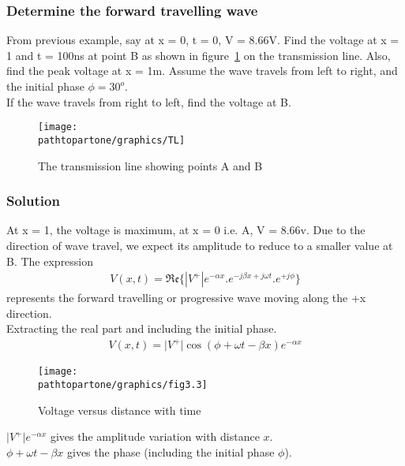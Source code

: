 \begin{exmp}
\subsubsection*{Determine the forward travelling wave}\label{exmp:forward}
From previous example, say at x = 0, t = 0, V = 8.66V. Find the voltage at x = 1 and t = 100ns at point B as shown in figure~\ref{fig:tl} on the transmission line. Also, find the peak voltage at x = 1m. Assume the wave travels from left to right, and the initial phase $\phi = 30^o$.\\
If the wave travels from right to left, find the voltage at B.
\begin{figure}[h]
\centering
\texttt{[image: \\pathtopartone/graphics/TL]}
\caption{The transmission line showing points A and B}
\label{fig:tl}
\end{figure}

\subsubsection*{Solution}
At x = 1, the voltage is maximum, at x = 0 i.e. A, V = 8.66v. Due to the direction of wave travel, we expect its amplitude to reduce to a smaller value at B. The expression
\begin{align}
V(x,t) = \mathfrak{Re}\{\left| V^+\right| e^{-\alpha x}.e^{-j\beta x + j\omega t}.e^{+j\phi}\} 
\label{eqn:voltagelec3soln}
\end{align}
represents the forward travelling or progressive wave moving along the +x direction.\\
Extracting the real part and including the initial phase.
\begin{align*}
V(x,t) = \lvert V^+\rvert\cos(\phi + \omega t - \beta x)e^{-\alpha x}
\end{align*}
\begin{figure}[h]
\centering
\texttt{[image: \\pathtopartone/graphics/fig3.3]}
\caption{Voltage versus distance with time}
\end{figure}

$\lvert V^+\rvert e^{-\alpha x} $ gives the amplitude variation with distance $ x $. \\
$ \phi + \omega t - \beta x $ gives the phase (including the initial phase $ \phi $).


\end{exmp}
